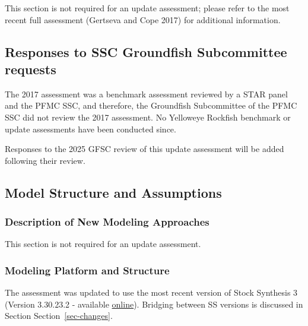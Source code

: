 \documentclass[
]{scrartcl}
\begin{document}
This section is not required for an update assessment; please refer to
the most recent full assessment (Gertseva and Cope 2017) for additional
information.

\subsection{Responses to SSC Groundfish Subcommittee
requests}\label{responses-to-ssc-groundfish-subcommittee-requests}

The 2017 assessment was a benchmark assessment reviewed by a STAR panel
and the PFMC SSC, and therefore, the Groundfish Subcommittee of the PFMC
SSC did not review the 2017 assessment. No Yelloweye Rockfish benchmark
or update assessments have been conducted since.

Responses to the 2025 GFSC review of this update assessment will be
added following their review.

\subsection{Model Structure and Assumptions}\label{sec-bridge}

\subsubsection{Description of New Modeling
Approaches}\label{description-of-new-modeling-approaches}

This section is not required for an update assessment.

\subsubsection{Modeling Platform and
Structure}\label{modeling-platform-and-structure}

The assessment was updated to use the most recent version of Stock
Synthesis 3 (Version 3.30.23.2 - available
\href{https://github.com/nmfs-ost/ss3-source-code/releases/tag/v3.30.23.2}{online}).
Bridging between SS versions is discussed in Section
Section~\ref{sec-changes}.
\end{document}
